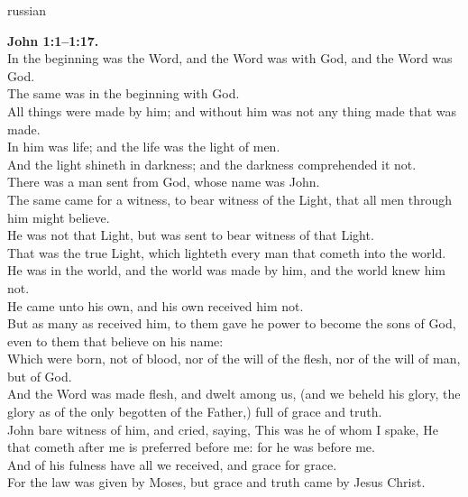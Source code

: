 \documentclass[10pt]{article} %
\begin{document}
{\begin{minipage}[t]{0.45\textwidth}
\begin{otherlanguage*}{russian}
\end{otherlanguage*}
\end{minipage}
\hfill
\begin{minipage}[t]{0.45\textwidth}

\textbf{John 1:1--1:17.}\\
In the beginning was the Word, and the Word was with God, and the Word was God.\\
The same was in the beginning with God.\\
All things were made by him; and without him was not any thing made that was made.\\
In him was life; and the life was the light of men.\\
And the light shineth in darkness; and the darkness comprehended it not.\\
There was a man sent from God, whose name was John.\\
The same came for a witness, to bear witness of the Light, that all men through him might believe.\\
He was not that Light, but was sent to bear witness of that Light.\\
That was the true Light, which lighteth every man that cometh into the world.\\
He was in the world, and the world was made by him, and the world knew him not.\\
He came unto his own, and his own received him not.\\
But as many as received him, to them gave he power to become the sons of God, even to them that believe on his name:\\
Which were born, not of blood, nor of the will of the flesh, nor of the will of man, but of God.\\
And the Word was made flesh, and dwelt among us, (and we beheld his glory, the glory as of the only begotten of the Father,) full of grace and truth.\\
John bare witness of him, and cried, saying, This was he of whom I spake, He that cometh after me is preferred before me: for he was before me.\\
And of his fulness have all we received, and grace for grace.\\
For the law was given by Moses, but grace and truth came by Jesus Christ.\\

\end{minipage}}
\vspace*{\fill}
\newpage
\Huge%
\vspace*{\fill}
\end{document}
